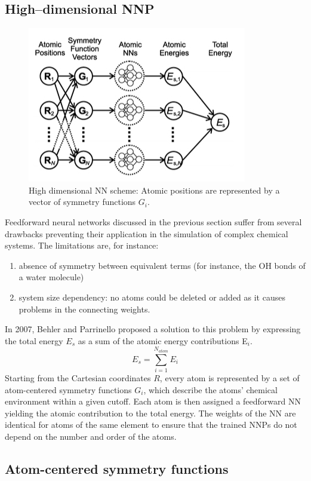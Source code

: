 \documentclass[12pt]{article}
\begin{document}
\subsection{High--dimensional NNP}
\begin{figure}[!htp]
    \centering
    \includegraphics[scale=0.7]{High-dimensional-NNP_scheme.jpeg}
    \caption{High dimensional NN scheme: Atomic positions are represented by a vector of symmetry functions $G_i$. }
    \label{High-dimensional-NNP_scheme}
\end{figure}
Feedforward neural networks discussed in the previous section suffer from several drawbacks preventing their application in the simulation of complex chemical systems. The limitations are, for instance:
\begin{enumerate}
    \item absence of symmetry between equivalent terms (for instance, the OH bonds of a water molecule)
    \item system size dependency: no atoms could be deleted or added as it causes problems in the connecting weights.
\end{enumerate}
In 2007, Behler and Parrinello proposed a solution to this problem by expressing the total energy $E_s$ as a sum of the atomic energy contributions E$_i$.\cite{Behler2007}
\begin{equation}
    E_s = \sum_{i=1}^{N_{atom}} E_i
\end{equation}
Starting from the Cartesian coordinates $R$, every atom is represented by a set of atom-centered symmetry functions $G_i$, which describe the atoms' chemical environment within a given cutoff. Each atom is then assigned a feedforward NN yielding the atomic contribution to the total energy. The weights of the NN are identical for atoms of the same element to ensure that the trained NNPs do not depend on the number and order of the atoms.
%
\subsection{Atom-centered symmetry functions}
\end{document}
